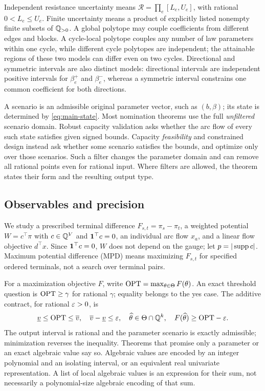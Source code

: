 Independent resistance uncertainty means
$\mathcal R=\prod_e[L_e,U_e]$, with rational $0<L_e\le U_e$.
Finite uncertainty means a product of explicitly listed nonempty finite
subsets of $\mathbb{Q}_{>0}$. A global polytope may couple coefficients from
different edges and blocks. A cycle-local polytope couples any number
of law parameters within one cycle, while different cycle polytopes are
independent; the attainable regions of these two models can differ
even on two cycles. Directional and symmetric intervals are also
distinct models: directional intervals are independent positive
intervals for $\beta_e^+$ and $\beta_e^-$, whereas a symmetric interval
constrains one common coefficient for both directions.

A scenario is an admissible original parameter vector, such as
$(b,\beta)$; its state is determined by \eqref{eq:main-state}. Most
nomination theorems use the full \emph{unfiltered} scenario domain.
Robust capacity validation asks whether the arc flow of every such
state satisfies given signed bounds. Capacity \emph{feasibility} and
constrained design instead ask whether some scenario satisfies the
bounds, and optimize only over those scenarios. Such a filter changes
the parameter domain and can remove all rational points even for
rational input. Where filters are allowed, the theorem states their
form and the resulting output type.

\subsection{Observables and precision}

We study a prescribed terminal difference $F_{s,t}=\pi_s-\pi_t$,
a weighted potential $W=c^\top\pi$ with $c\in\mathbb{Q}^V$ and $\mathbf{1}^\top c=0$,
an individual arc flow $x_a$, and a linear flow objective $d^\top x$.
Since $\mathbf{1}^\top c=0$, $W$ does not depend on the gauge; let
$p=|\operatorname{supp} c|$. Maximum potential difference (MPD) means maximizing
$F_{s,t}$ for specified ordered terminals, not a search over terminal
pairs.

For a maximization objective $F$, write
$\mathrm{OPT}=\max_{\theta\in\Theta}F(\theta)$.
An exact threshold question is $\mathrm{OPT}\ge\gamma$ for rational $\gamma$;
equality belongs to the yes case. The additive contract, for rational
$\varepsilon>0$, is
\begin{equation}
 \underline v\le\mathrm{OPT}\le\overline v,\quad
 \overline v-\underline v\le\varepsilon,\quad
 \widehat\theta\in\Theta\cap\mathbb{Q}^k,\quad
 F(\widehat\theta)\ge\mathrm{OPT}-\varepsilon.
 \label{eq:main-contract}
\end{equation}
The output interval is rational and the parameter scenario is exactly
admissible; minimization reverses the inequality. Theorems that promise
only a parameter or an exact algebraic value say so. Algebraic values
are encoded by an integer polynomial and an isolating interval, or an
equivalent real univariate representation. A list of local algebraic
values is an expression for their sum, not necessarily a
polynomial-size algebraic encoding of that sum.

